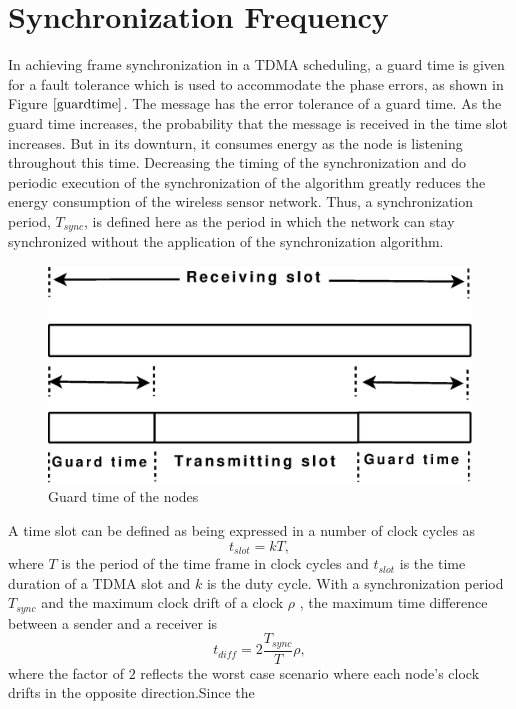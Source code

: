 \documentclass[a4paper,10pt]{report}
\begin{document}
\section{\textbf{Synchronization Frequency}}\noindent
In achieving frame synchronization in a TDMA scheduling, a guard time is given for a fault tolerance which is used to accommodate the
phase errors, as shown in Figure $\ref{guardtime}$. The message has the error tolerance of a guard time. As the guard time increases,
the probability that the message is received in the time slot increases. But in its downturn, it consumes energy as the node is
listening throughout this time.
\newline Decreasing the timing of the synchronization and do periodic execution of the synchronization of the algorithm greatly reduces
the energy consumption of the wireless sensor network. Thus, a synchronization period, $T_{sync}$, is defined here as the period in which the network can stay synchronized without the application of the synchronization algorithm.
\begin{figure}
\centering
\includegraphics[width=0.6 \textwidth]{guardtime}
\caption{Guard time of the nodes} \label{guardtime}
\end{figure}
\newline
A time slot can be defined as being expressed in a number of clock cycles as
\begin{equation}
t_{slot} = kT ,
\end{equation}
where $T$ is the period of the time frame in clock cycles and $t_{slot}$ is the time duration of a TDMA slot and $k$ is the duty
cycle.
\newline
With a synchronization period $T_{sync}$ and the maximum clock drift of a clock $\rho$ , the maximum time difference between a sender and a receiver is
\begin{equation}
t_{diff} = 2\frac{T_{sync}}{T}\rho ,
\end{equation}
where the factor of $2$ reflects the worst case scenario where each node's clock drifts in the opposite direction.\newline Since the
\end{document}
